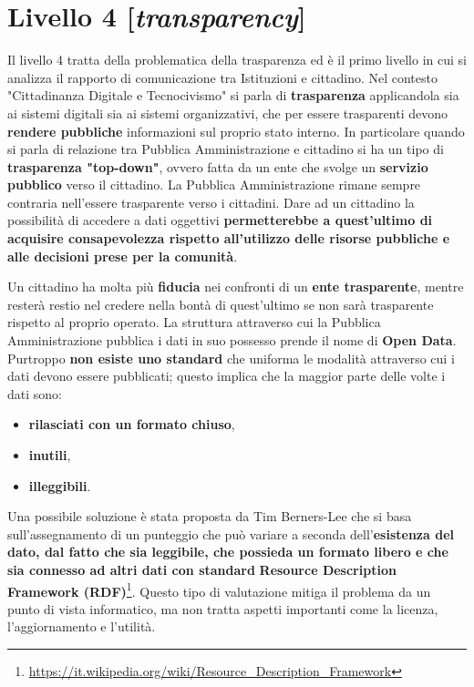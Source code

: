 \chapter{Livello 4 [\emph{transparency}]}
Il livello 4  tratta della problematica della trasparenza ed è il primo livello in cui si analizza il rapporto di comunicazione tra Istituzioni e cittadino.
Nel contesto "Cittadinanza Digitale e Tecnocivismo" si parla di \textbf{trasparenza} applicandola sia ai sistemi digitali sia ai sistemi organizzativi, che per essere trasparenti devono \textbf{rendere pubbliche} informazioni sul proprio stato interno. In particolare quando si parla di relazione tra Pubblica Amministrazione e cittadino si ha un tipo di \textbf{trasparenza "top-down"}, ovvero fatta da un ente che svolge un \textbf{servizio pubblico} verso il cittadino.
\bigbreak
La Pubblica Amministrazione rimane sempre contraria nell'essere trasparente verso i cittadini. Dare ad un cittadino la possibilità di accedere a dati oggettivi \textbf{permetterebbe a quest'ultimo di acquisire consapevolezza rispetto all'utilizzo delle risorse pubbliche e alle decisioni prese per la comunità}.

Un cittadino ha molta più \textbf{fiducia} nei confronti di un \textbf{ente trasparente}, mentre resterà restio nel credere nella bontà di quest'ultimo se non sarà trasparente rispetto al proprio operato.
\bigbreak
La struttura attraverso cui la Pubblica Amministrazione pubblica i dati in suo possesso prende il nome di \textbf{Open Data}. Purtroppo \textbf{non esiste uno standard} che uniforma le modalità attraverso cui i dati devono essere pubblicati; questo implica che la maggior parte delle volte i dati sono:
\begin{itemize}
    \item \textbf{rilasciati con un formato chiuso},
    \item \textbf{inutili},
    \item \textbf{illeggibili}.
\end{itemize}
\bigbreak
Una possibile soluzione è stata proposta da Tim Berners-Lee che si basa sull'assegnamento di un punteggio che può variare a seconda dell'\textbf{esistenza del dato, dal fatto che sia leggibile, che possieda un formato libero e che sia connesso ad altri dati con standard} \textbf{Resource Description Framework (RDF)}\footnote{\url{https://it.wikipedia.org/wiki/Resource_Description_Framework}}. 
Questo tipo di valutazione mitiga il problema da un punto di vista informatico, ma non tratta aspetti importanti come la licenza, l'aggiornamento e l'utilità.


